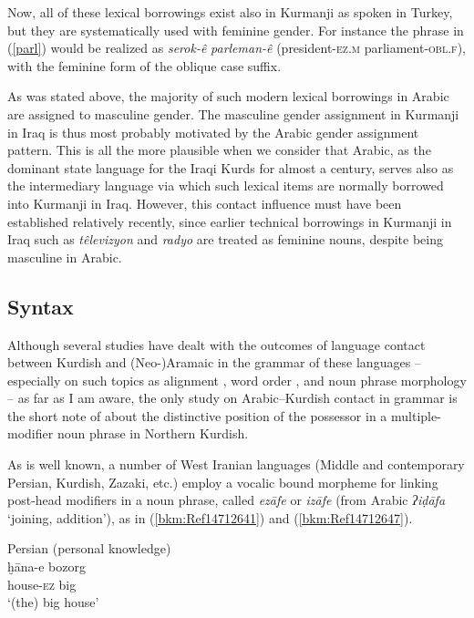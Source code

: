 \documentclass[output=paper]{langsci/langscibook}
\begin{document}
Now, all of these lexical borrowings exist also in Kurmanji as spoken in Turkey, but they are systematically used with feminine gender. For instance the phrase in (\ref{parl}) would be realized as \textit{serok-ê} \textit{parleman-ê} (president-\textsc{ez.m} parliament-\textsc{obl.f}), with the feminine form of the oblique case suffix. 

As was stated above, the majority of such modern lexical borrowings in Arabic are assigned to masculine gender. The masculine gender assignment in Kurmanji in Iraq is thus most probably motivated by the Arabic gender assignment pattern. This is all the more plausible when we consider that Arabic, as the dominant state language for the Iraqi Kurds for almost a century, serves also as the intermediary language via which such lexical items are normally borrowed into Kurmanji in Iraq. However, this contact influence must have been established relatively recently, since earlier technical borrowings in Kurmanji in Iraq such as \textit{têlevizyon} and \textit{radyo} are treated as feminine nouns, despite being masculine in Arabic.  

\subsection{\label{bkm:Ref520275931} Syntax}

Although several studies have dealt with the outcomes of language contact between Kurdish and (Neo-)Aramaic in the grammar of these languages – especially on such topics as alignment \citep{Coghill2016}, word order \citep{Haig2014}, and noun phrase morphology \citep{Noorlander2014} – as far as I am aware, the only study on Arabic–Kurdish contact in grammar is the short note of \citet{Tsabolov1994} about the distinctive position of the possessor in a multiple-modifier noun phrase in Northern Kurdish. 

As is well known, a number of West Iranian languages (Middle and contemporary Persian, Kurdish, Zazaki, etc.) employ a vocalic bound morpheme for linking post-head modifiers in a noun phrase, called \textit{ezāfe} or \textit{izāfe} (from Arabic \textit{ʔiḍāfa} ‘joining, addition’), as in (\ref{bkm:Ref14712641}) and (\ref{bkm:Ref14712647}). 

\ea\label{bkm:Ref14712641}Persian (personal knowledge)\\
\gll ḫāna-e bozorg\\
     house-\textsc{ez} big\\
\glt ‘(the) big house’
\z
\end{document}
